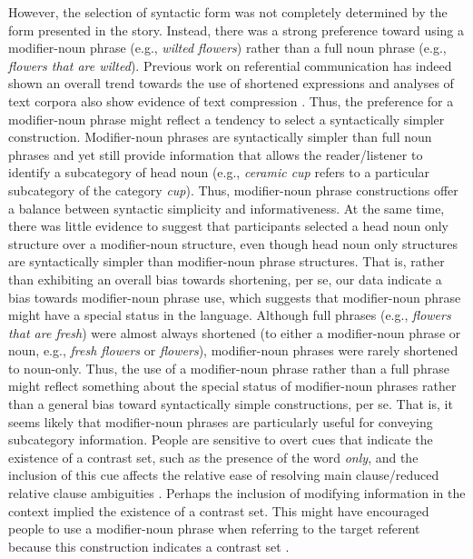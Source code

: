 \documentclass[output=paper]{langsci/langscibook}
\begin{document}
However, the selection of syntactic form was not completely determined
by the form presented in the story. Instead, there was a strong
preference toward using a modifier-noun phrase (e.g., \textit{wilted flowers})
rather than a full noun phrase (e.g., \textit{flowers that are wilted}).
Previous work on referential communication has indeed shown an overall
trend towards the use of shortened expressions
\citep{brennan1996conceptual,markman1997creation} and analyses of text
corpora also show evidence of text compression
\citep{marsh1984computational}. Thus, the preference for a
modifier-noun phrase might reflect a tendency to select a
syntactically simpler construction. Modifier-noun phrases are
syntactically simpler than full noun phrases and yet still provide
information that allows the reader/listener to identify a subcategory
of head noun (e.g., \textit{ceramic cup} refers to a particular
subcategory of the category \textit{cup}). Thus, modifier-noun phrase
constructions offer a balance between syntactic simplicity and
informativeness. At the same time, there was little evidence to
suggest that participants selected a head noun only structure over a
modifier-noun structure, even though head noun only structures are
syntactically simpler than modifier-noun phrase structures. That is,
rather than exhibiting an overall bias towards shortening, per se, our
data indicate a bias towards modifier-noun phrase use, which suggests
that modifier-noun phrase might have a special status in the
language. Although full phrases (e.g., \textit{flowers that are
  fresh}) were almost always shortened (to either a modifier-noun
phrase or noun, e.g., \textit{fresh flowers} or \textit{flowers}),
modifier-noun phrases were rarely shortened to noun-only.  Thus, the
use of a modifier-noun phrase rather than a full phrase might reflect
something about the special status of modifier-noun phrases rather
than a general bias toward syntactically simple constructions, per
se. That is, it seems likely that modifier-noun phrases are
particularly useful for conveying subcategory information. People are
sensitive to overt cues that indicate the existence of a contrast set,
such as the presence of the word \textit{only}, and the inclusion of
this cue affects the relative ease of resolving main clause/reduced
relative clause ambiguities \citep{sedivy2002invoking}. Perhaps the
inclusion of modifying information in the context implied the
existence of a contrast set. This might have encouraged people to use
a modifier-noun phrase when referring to the target referent because
this construction indicates a contrast set
\citep{markman1991categorization}.
\end{document}
